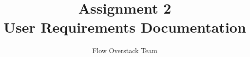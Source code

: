 \documentclass[12pt]{scrartcl}
\title{Assignment 2\\ User Requirements Documentation}
\author{Flow Overstack Team}
\date{}
\begin{document}
\maketitle

\section*{}
\end{document}
